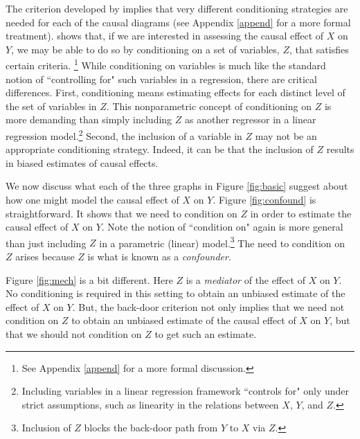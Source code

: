 \documentclass[12pt,reqno,titlepage]{amsart}
\begin{document}
\begin{doublespace}
The criterion developed by \citet{Pearl:2009vo} implies that very different conditioning strategies are needed for each of the causal diagrams (see Appendix \ref{append} for a more formal treatment). 
\citet{Pearl:2009vo} shows that, if we are interested in assessing the causal effect of $X$ on $Y$, we may be able to do so by conditioning on a set of variables, $Z$, that satisfies certain criteria.
\footnote{See Appendix \ref{append} for a more formal discussion.}
While conditioning on variables is much like the standard notion of ``controlling for" such variables in a regression, there are critical differences.
First, conditioning means estimating effects for each distinct level of the set of variables in $Z$. 
This nonparametric concept of conditioning on $Z$ is more demanding than simply including $Z$ as another regressor in a linear regression model.\footnote{Including variables in a linear regression framework ``controls for" only under strict assumptions, such as linearity in the relations between $X$, $Y$, and $Z$.}
Second, the inclusion of a variable in $Z$ may not be an appropriate conditioning strategy. 
Indeed, it can be that the inclusion of $Z$ results in biased estimates of causal effects.

We now discuss what each of the three graphs in Figure \ref{fig:basic} suggest about how one might model the causal effect of $X$ on $Y$.	
Figure \ref{fig:confound} is straightforward. It shows that we need to condition on $Z$ in order to estimate the causal effect of $X$ on $Y$.
Note the notion of ``condition on" again is more general than just including $Z$ in a parametric (linear) model.\footnote{
Inclusion of $Z$ blocks the back-door path from $Y$ to $X$ via $Z$.} The need to condition on $Z$ arises because $Z$ is what is known as a \emph{confounder}.


Figure \ref{fig:mech} is a bit different. Here $Z$ is a \emph{mediator} of the effect of $X$ on $Y$.
No conditioning is required in this setting to obtain an unbiased estimate of the effect of $X$ on $Y$.
But, the back-door criterion not only implies that we need not condition on $Z$ to obtain an unbiased estimate of the causal effect of $X$ on $Y$, but that we should not condition on $Z$ to get such an estimate.


\end{doublespace}
\end{document}
